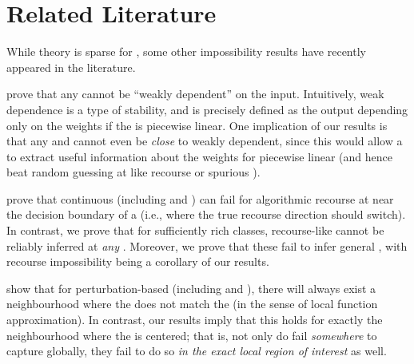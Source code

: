 
\section{Related Literature}\label{sec:literature}

%
%

While theory is sparse for \covname{} \attname{}, some other impossibility results have recently appeared in the literature.

\citet{srinivas19gradient} prove that any \completename{} \fielddefname{} cannot be ``weakly dependent'' on the input. Intuitively, weak dependence is a type of stability, and is precisely defined as the \fielddefname{} output depending only on the weights if the \modelname{} is piecewise linear.
One implication of our results is that any \completename{} and \linearname{} \fielddefname{} cannot even be \emph{close} to weakly dependent, since this would allow a \hyptestname{} to extract useful information about the weights for piecewise linear \modelnames{} (and hence beat random guessing at \tasknames{} like recourse or spurious \covnames{}).

\citet{fokkema22explanations} prove that continuous \fielddefnames{} (including \shap{} and \intgradshort{}) can fail for algorithmic recourse at \obsnames{} near the decision boundary of a \modelname{} (i.e., where the true recourse direction should switch).
In contrast, we prove that for sufficiently rich \modelname{} classes, recourse-like \countmodbehaviourname{} cannot be reliably inferred at \emph{any} \obsname{}.
Moreover, we prove that these \methodnames{} fail to infer general \countmodbehaviourname{}, with recourse impossibility being a corollary of our results.

\citet{han22function} show that for perturbation-based \fielddefnames{} (including \shap{} and \intgradshort{}), there will always exist a neighbourhood where the \covname{} \attname{} does not match the \modelname{} (in the sense of local function approximation).
In contrast, our results imply that this holds for exactly the neighbourhood where the \fielddefname{} is centered; that is, not only do \fielddefnames{} fail \textit{somewhere} to capture \modbehaviourname{} globally, they fail to do so \textit{in the exact local region of interest} as well. 

